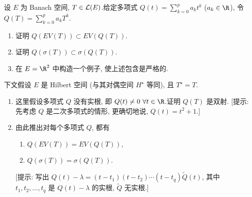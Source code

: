\begin{exercise}
\label{exer:6.22}
设 $E$ 为 Banach 空间, $T\in\mathcal{L}(E)$.给定多项式
$Q(t)=\sum_{k=0}^pa_kt^k$ ($a_k\in\R$), 令
$Q(T)=\sum_{k=0}^pa_kT^k$.
\begin{enumerate}[label=\arabic*., leftmargin=2.2em, itemsep=0.3em]
	\item 证明 $Q(EV(T))\subset EV(Q(T))$.
	\item 证明 $Q(\sigma(T))\subset\sigma(Q(T))$.
	\item 在 $E=\R^2$ 中构造一个例子, 使上述包含是严格的.
\end{enumerate}

下文假设 $E$ 是 Hilbert 空间 (与其对偶空间 $H^\star$ 等同), 且
$T^\star=T$.

\begin{enumerate}[label=\arabic*., leftmargin=2.2em, start=4, itemsep=0.3em]
	\item 这里假设多项式 $Q$ 没有实根, 即
	      $Q(t)\ne0\ \forall t\in\R$.证明 $Q(T)$ 是双射.
	      [提示: 先考虑 $Q$ 是二次多项式的情形, 更确切地说,
	      $Q(t)=t^2+1$.]
	\item 由此推出对每个多项式 $Q$, 都有
	      \begin{enumerate}[label=(\roman*), leftmargin=2.4em, itemsep=0.1em]
	      	\item $Q(EV(T))=EV(Q(T))$,
	      	\item $Q(\sigma(T))=\sigma(Q(T))$.
	      \end{enumerate}
	      [提示: 写出
	      $Q(t)-\lambda=(t-t_1)(t-t_2)\cdots(t-t_q)\tilde Q(t)$, 其中
	      $t_1,t_2,\dots,t_q$ 是 $Q(t)-\lambda$ 的实根, $\tilde Q$ 无实根.]
\end{enumerate}
\end{exercise}

